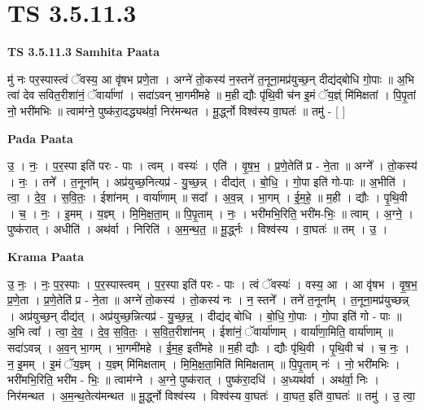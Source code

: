 \documentclass[17pt]{extarticle}
\begin{document}
\section{ TS 3.5.11.3 }

\textbf{TS 3.5.11.3 } \newline
\textbf{Samhita Paata} \newline

मु॑ नः पर॒स्पास्त्वं ॅवस्य॒ आ वृ॑षभ प्रणे॒ता । अग्ने॑ तो॒कस्य॑ न॒स्तने॑ त॒नूना॒मप्र॑युच्छ॒न् दीद्य॑द्बोधि गो॒पाः ॥ अ॒भि त्वा॑ देव सवित॒रीशा॑नं॒ ॅवार्या॑णां । सदा॑ऽवन् भा॒गमी॑महे ॥ म॒ही द्यौः पृ॑थि॒वी च॑न इ॒मं ॅय॒ज्ञ्ं मि॑मिक्षतां । पि॒पृ॒तां नो॒ भरी॑मभिः ॥ त्वाम॑ग्ने॒ पुष्क॑रा॒दद्ध्यथ॑र्वा॒ निर॑मन्थत । मू॒र्द्ध्नो विश्व॑स्य वा॒घतः॑ ॥ तमु॑ - [  ] \newline

\textbf{Pada Paata} \newline

उ॒ । नः॒ । प॒र॒स्पा इति॑ परः - पाः । त्वम् । वस्यः॑ । एति॑ । वृ॒ष॒भ॒ । प्र॒णे॒तेति॑ प्र - ने॒ता ॥ अग्ने᳚ । तो॒कस्य॑ । नः॒ । तने᳚ । त॒नूना᳚म् । अप्र॑युच्छ॒नित्यप्र॑ - यु॒च्छ॒न्न् । दीद्य॑त् । बो॒धि॒ । गो॒पा इति॑ गो-पाः ॥ अ॒भीति॑ । त्वा॒ । दे॒व॒ । स॒वि॒तः॒ । ईशा॑नम् । वार्या॑णाम् ॥ सदा᳚ । अ॒व॒न्न् । भा॒गम् । ई॒म॒हे॒ ॥ म॒ही । द्यौः । पृ॒थि॒वी । च॒ । नः॒ । इ॒मम् । य॒ज्ञ्म् । मि॒मि॒क्ष॒ता॒म् ॥ पि॒पृ॒ताम् । नः॒ । भरी॑मभि॒रिति॒ भरी॑म-भिः॒ ॥ त्वाम् । अ॒ग्ने॒ । पुष्क॑रात् । अधीति॑ । अथ॑र्वा । निरिति॑ । अ॒म॒न्थ॒त॒ ॥ मू॒र्द्ध्नः । विश्व॑स्य । वा॒घतः॑ ॥ तम् । उ॒ ।  \newline


\textbf{Krama Paata} \newline

उ॒ नः॒ । नः॒ प॒र॒स्पाः । प॒र॒स्पास्त्वम् । प॒र॒स्पा इति॑ परः - पाः । त्वं ॅवस्यः॑ । वस्य॒ आ । आ वृ॑षभ । वृ॒ष॒भ॒ प्र॒णे॒ता । प्र॒णे॒तेति॑ प्र - ने॒ता ॥ अग्ने॑ तो॒कस्य॑ । तो॒कस्य॑ नः । न॒ स्तने᳚ । तने॑ त॒नूना᳚म् । त॒नूना॒मप्र॑युच्छन्न् । अप्र॑युच्छ॒न् दीद्य॑त् । अप्र॑युच्छ॒न्नित्यप्र॑ - यु॒च्छ॒न्न्॒ । दीद्य॑द् बोधि । बो॒धि॒ गो॒पाः । गो॒पा इति॑ गो - पाः ॥ अ॒भि त्वा᳚ । त्वा॒ दे॒व॒ । दे॒व॒ स॒वि॒तः॒ । स॒वि॒त॒रीशा॑नम् । ईशा॑नं॒ ॅवार्या॑णाम् । वार्या॑णा॒मिति॒ वार्या॑णाम् ॥ सदा॑ऽवन्न् । अ॒व॒न् भा॒गम् । भा॒गमी॑महे । ई॒म॒ह॒ इती॑महे ॥ म॒ही द्यौः । द्यौः पृ॑थि॒वी । पृ॒थि॒वी च॑ । च॒ नः॒ । न॒ इ॒मम् । इ॒मं ॅय॒ज्ञ्म् । य॒ज्ञ्म् मि॑मिक्षताम् । मि॒मि॒क्ष॒ता॒मिति॑ मिमिक्षताम् ॥ पि॒पृ॒ताम् नः॑ । नो॒ भरी॑मभिः । भरी॑मभि॒रिति॒ भरी॑म - भिः॒ ॥ त्वाम॑ग्ने । अ॒ग्ने॒ पुष्क॑रात् । पुष्क॑रा॒दधि॑ । अ॒ध्यथ॑र्वा । अथ॑र्वा॒ निः । निर॑मन्थत । अ॒म॒न्थ॒तेत्य॑मन्थत ॥ मू॒र्द्ध्नो विश्व॑स्य । विश्व॑स्य वा॒घतः॑ । वा॒घत॒ इति॑ वा॒घतः॑ ॥ तमु॑ । उ॒ त्वा॒ \newline
\end{document}

